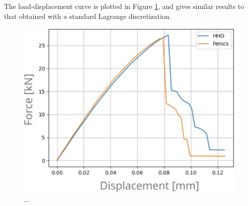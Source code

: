 The load-displacement curve is plotted
in Figure \ref{fig_matrix_curve}, and gives similar results to that obtained with a standard Lagrange discretization.
%
% 
% 
\begin{figure}[H]
    \centering
    \includegraphics[width=7.cm]{../chapter_004_hho_micromorphic/figures/plate_curve.png}
    \caption{...}
    \label{fig_matrix_curve}
\end{figure}